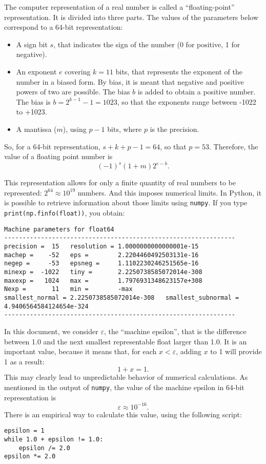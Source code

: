 \documentclass[12pt,a4paper]{article}
\begin{document}
The computer representation of a real number is called a ``floating-point'' representation. It is divided into three parts. The values of the parameters below correspond to a 64-bit representation:
\begin{itemize}
\item A sign bit $s$, that indicates the sign of the number (0 for positive, 1 for negative).
\item An exponent $e$ covering $k=11$ bits, that represents the exponent of the number in a biased form. By bias, it is meant that negative and positive powers of two are possible. The bias $b$ is added to obtain a positive number. The bias is $b=2^{k-1}-1=1023$, so that the exponents range between -1022 to +1023.
\item A mantissa ($m$), using $p-1$ bits, where $p$ is the precision. 
\end{itemize}
So, for a 64-bit representation, $s+k+p-1=64$, so that $p=53$.
Therefore, the value of a floating point number is
\[
(-1)^s (1+m) 2^{e-b}.
\]

This representation allows for only a finite quantity of real numbers to be represented: $2^{64} \approx 10^{19}$ numbers. And this imposes numerical limits. In Python, it is possible to retrieve information about those limits using \lstinline+numpy+. If you type \lstinline+print(np.finfo(float))+, you obtain:
\begin{lstlisting}
Machine parameters for float64
---------------------------------------------------------------
precision =  15   resolution = 1.0000000000000001e-15
machep =    -52   eps =        2.2204460492503131e-16
negep =     -53   epsneg =     1.1102230246251565e-16
minexp =  -1022   tiny =       2.2250738585072014e-308
maxexp =   1024   max =        1.7976931348623157e+308
Nexp =       11   min =        -max
smallest_normal = 2.2250738585072014e-308   smallest_subnormal = 4.9406564584124654e-324
---------------------------------------------------------------  
\end{lstlisting}



In this document, we consider $\varepsilon$, the ``machine epsilon'', that is the difference between 1.0 and the next smallest representable float larger than 1.0. It is an important value, because it means that, for each $x < \varepsilon$, adding $x$ to 1 will provide 1 as a result:
\[
1 + x = 1.
\]
This may clearly lead to unpredictable behavior of numerical calculations. As mentioned in the output of \lstinline+numpy+, the value of the machine epsilon in 64-bit representation is
\[
\varepsilon \approx 10^{-16}.
\]
There is an empirical way to calculate this value, using the following script:
\begin{lstlisting}
epsilon = 1
while 1.0 + epsilon != 1.0:
    epsilon /= 2.0
epsilon *= 2.0
\end{lstlisting}
\end{document}
